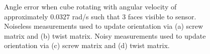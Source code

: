 \begin{figure}
{\begin{minipage}[b]{0.45\columnwidth}
 	\end{minipage}}
 	\caption{Angle error when cube rotating with angular velocity of approximately $0.0327$ rad/s such that 3 faces visible to sensor. Noiseless measurements used to update orientation via (a) screw matrix and (b) twist matrix. Noisy measurements used to update orientation via (c) screw matrix and (d) twist matrix.}
 	\label{fig:angle_error_rotating}
\end{figure}

